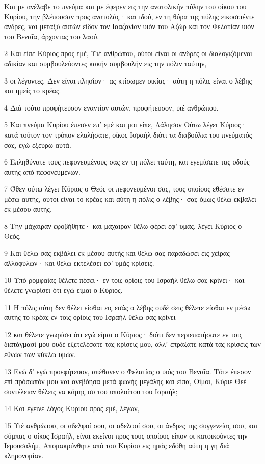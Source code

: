 \par Και με ανέλαβε το πνεύμα και με έφερεν εις την ανατολικήν πύλην του οίκου του Κυρίου, την βλέπουσαν προς ανατολάς· και ιδού, εν τη θύρα της πύλης εικοσιπέντε άνδρες, και μεταξύ αυτών είδον τον Ιααζανίαν υιόν του Αζώρ και τον Φελατίαν υιόν του Βεναΐα, άρχοντας του λαού.
\par 2 Και είπε Κύριος προς εμέ, Υιέ ανθρώπου, ούτοι είναι οι άνδρες οι διαλογιζόμενοι αδικίαν και συμβουλεύοντες κακήν συμβουλήν εις την πόλιν ταύτην,
\par 3 οι λέγοντες, Δεν είναι πλησίον· ας κτίσωμεν οικίας· αύτη η πόλις είναι ο λέβης και ημείς το κρέας.
\par 4 Διά τούτο προφήτευσον εναντίον αυτών, προφήτευσον, υιέ ανθρώπου.
\par 5 Και πνεύμα Κυρίου έπεσεν επ' εμέ και μοι είπε, Λάλησον Ούτω λέγει Κύριος· κατά τούτον τον τρόπον ελαλήσατε, οίκος Ισραήλ διότι τα διαβούλια του πνεύματός σας, εγώ εξεύρω αυτά.
\par 6 Επληθύνατε τους πεφονευμένους σας εν τη πόλει ταύτη, και εγεμίσατε τας οδούς αυτής από πεφονευμένων.
\par 7 Όθεν ούτω λέγει Κύριος ο Θεός οι πεφονευμένοι σας, τους οποίους εθέσατε εν μέσω αυτής, ούτοι είναι το κρέας και αύτη η πόλις ο λέβης· σας όμως θέλω εκβάλει εκ μέσου αυτής.
\par 8 Την μάχαιραν εφοβήθητε· και μάχαιραν θέλω φέρει εφ' υμάς, λέγει Κύριος ο Θεός.
\par 9 Και θέλω σας εκβάλει εκ μέσου αυτής και θέλω σας παραδώσει εις χείρας αλλοφύλων· και θέλω εκτελέσει εφ' υμάς κρίσεις.
\par 10 Υπό ρομφαίας θέλετε πέσει· εν τοις ορίοις του Ισραήλ θέλω σας κρίνει· και θέλετε γνωρίσει ότι εγώ είμαι ο Κύριος.
\par 11 Η πόλις αύτη δεν θέλει είσθαι εις εσάς ο λέβης ουδέ σεις θέλετε είσθαι εν μέσω αυτής το κρέας εν τοις ορίοις του Ισραήλ θέλω σας κρίνει
\par 12 και θέλετε γνωρίσει ότι εγώ είμαι ο Κύριος· διότι δεν περιεπατήσατε εν τοις διατάγμασί μου ουδέ εξετελέσατε τας κρίσεις μου, αλλ' επράξατε κατά τας κρίσεις των εθνών των κύκλω υμών.
\par 13 Ενώ δ' εγώ προεφήτευον, απέθανεν ο Φελατίας ο υιός του Βεναΐα. Τότε έπεσον επί πρόσωπόν μου και ανεβόησα μετά φωνής μεγάλης και είπα, Οίμοι, Κύριε Θεέ συντέλειαν θέλεις να κάμης συ του υπολοίπου του Ισραήλ;
\par 14 Και έγεινε λόγος Κυρίου προς εμέ, λέγων,
\par 15 Υιέ ανθρώπου, οι αδελφοί σου, οι αδελφοί σου, οι άνδρες της συγγενείας σου, και σύμπας ο οίκος Ισραήλ, είναι εκείνοι προς τους οποίους είπον οι κατοικούντες την Ιερουσαλήμ, Απομακρύνθητε από του Κυρίου εις ημάς εδόθη αύτη η γη διά κληρονομίαν.
